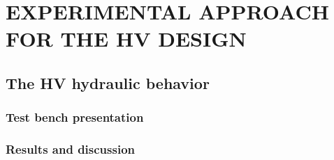 \documentclass[3p,twocolumn,preprint]{elsarticle}
\begin{document}
\section{EXPERIMENTAL APPROACH FOR THE HV \mbox{DESIGN}}
\label{sec:EXPERIMENTAL APPROACH FOR THE HV DESIGN}

	\subsection{The HV hydraulic behavior}	
	\label{The hydraulic valves}

	\subsubsection{Test bench presentation}

	\subsubsection{Results and discussion}
\end{document}
